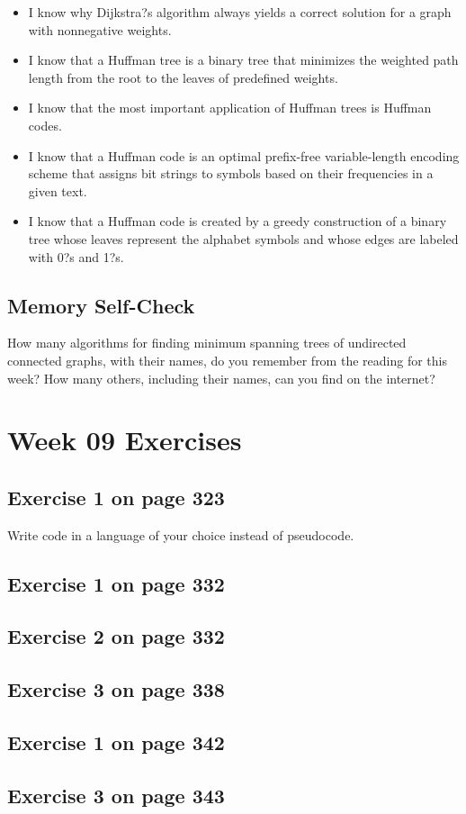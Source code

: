 \documentclass[12pt]{amsart}
\begin{document}
\begin{itemize}
 \item I know why Dijkstra?s algorithm always yields a correct solution for a graph with nonnegative weights.
 \item I know that a Huffman tree is a binary tree that minimizes the weighted path length from the root to the leaves of predefined weights.
 \item I know that the most important application of Huffman trees is Huffman codes.
 \item I know that a Huffman code is an optimal prefix-free variable-length encoding scheme that assigns bit strings to symbols based on their frequencies in a given text.
 \item I know that a Huffman code is created by a greedy construction of a binary tree whose leaves represent the alphabet symbols and whose edges are labeled with 0?s and 1?s.
\end{itemize}
\subsection{Memory Self-Check}
How many algorithms for finding minimum spanning trees of undirected connected graphs, with their names, do you remember from the reading for this week? How many others, including their names, can you find on the internet?
 \section{Week 09 Exercises}
\subsection{ Exercise 1 on page 323}
Write code in a language of your choice instead of pseudocode. 
\subsection{Exercise 1 on page 332} 
\subsection{Exercise 2 on page 332} 
\subsection{Exercise 3 on page 338} 
\subsection{Exercise 1 on page 342} 
\subsection{Exercise 3 on page 343}
\end{document}
